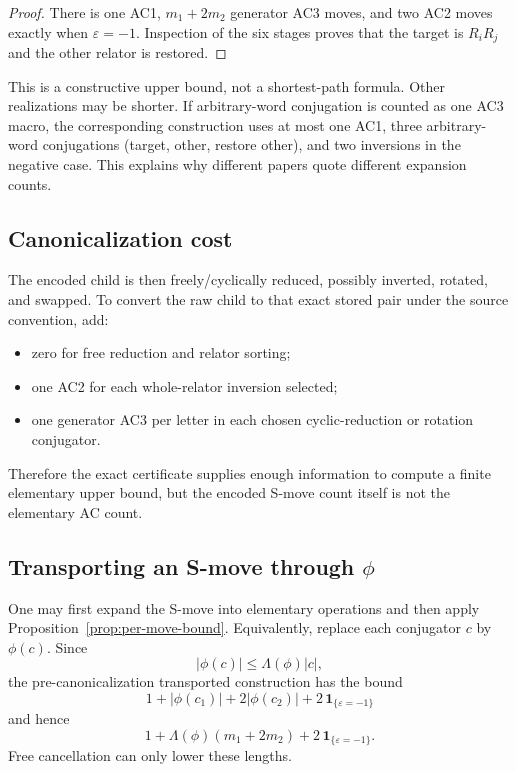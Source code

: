 \documentclass[11pt]{article}
\theoremstyle{definition}
\theoremstyle{remark}
\newcommand{\len}[1]{\left|#1\right|}
\newcommand{\eps}{\varepsilon}
\begin{document}
\begin{proof}
There is one AC1, \(m_1+2m_2\) generator AC3 moves, and two AC2 moves
exactly when \(\eps=-1\).  Inspection of the six stages proves that the
target is \(R_iR_j\) and the other relator is restored.
\end{proof}

This is a constructive upper bound, not a shortest-path formula.  Other
realizations may be shorter.  If arbitrary-word conjugation is counted as
one AC3 macro, the corresponding construction uses at most one AC1, three
arbitrary-word conjugations (target, other, restore other), and two
inversions in the negative case.  This explains why different papers quote
different expansion counts.

\subsection{Canonicalization cost}

The encoded child is then freely/cyclically reduced, possibly inverted,
rotated, and swapped.  To convert the raw child to that exact stored pair
under the source convention, add:
\begin{itemize}
  \item zero for free reduction and relator sorting;
  \item one AC2 for each whole-relator inversion selected;
  \item one generator AC3 per letter in each chosen cyclic-reduction or
  rotation conjugator.
\end{itemize}
Therefore the exact certificate supplies enough information to compute a
finite elementary upper bound, but the encoded S-move count itself is not
the elementary AC count.

\subsection{Transporting an S-move through \(\phi\)}

One may first expand the S-move into elementary operations and then apply
Proposition~\ref{prop:per-move-bound}.  Equivalently, replace each
conjugator \(c\) by \(\phi(c)\).  Since
\[
  \len{\phi(c)}\le\Lambda(\phi)\len{c},
\]
the pre-canonicalization transported construction has the bound
\[
  1+\len{\phi(c_1)}+2\len{\phi(c_2)}
  +2\,\mathbf 1_{\{\eps=-1\}}
\]
and hence
\[
  1+\Lambda(\phi)(m_1+2m_2)
  +2\,\mathbf 1_{\{\eps=-1\}}.
\]
Free cancellation can only lower these lengths.
\end{document}
